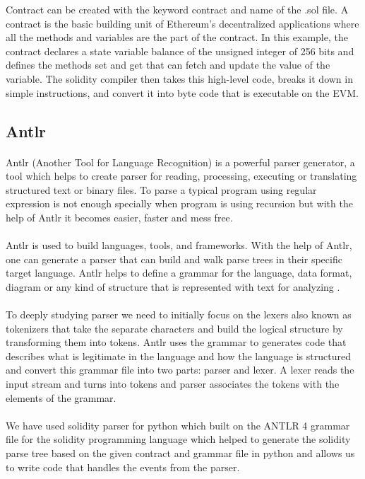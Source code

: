\documentclass[11pt]{article}
\begin{document}
Contract can be created with the keyword contract and name of the .sol file. A contract is the basic building unit of Ethereum’s decentralized applications where all the methods and variables are the part of the contract. In this example, the contract declares a state variable balance of the unsigned integer of 256 bits and defines the methods set and get that can fetch and update the value of the variable. The solidity compiler then takes this high-level code, breaks it down in simple instructions, and convert it into byte code that is executable on the EVM.

\subsection{Antlr}
\paragraph{}
Antlr (Another Tool for Language Recognition) is a powerful parser generator, a tool which helps to create parser for reading, processing, executing or translating structured text or binary files. To parse a typical program using regular expression is not enough specially when program is using recursion but with the help of Antlr it becomes easier, faster and mess free. 
\paragraph{}
Antlr is used to build languages, tools, and frameworks. With the help of Antlr, one can generate a parser that can build and walk parse trees in their specific target language. Antlr helps to define a grammar for the language, data format, diagram or any kind of structure that is represented with text for analyzing \cite{ANTLR17:online}.
\paragraph{}
To deeply studying parser we need to initially focus on the lexers also known as tokenizers that take the separate characters and build the logical structure by transforming them into tokens. Antlr uses the grammar to generates code that describes what is legitimate in the language and how the language is structured and convert this grammar file into two parts: parser and lexer. A lexer reads the input stream and turns into tokens and parser associates the tokens with the elements of the grammar.
\paragraph{}
We have used solidity parser for python which built on the ANTLR 4 grammar file for the solidity programming language which helped to generate the solidity parse tree based on the given contract and grammar file in python and allows us to write code that handles the events from the parser.
\end{document}
